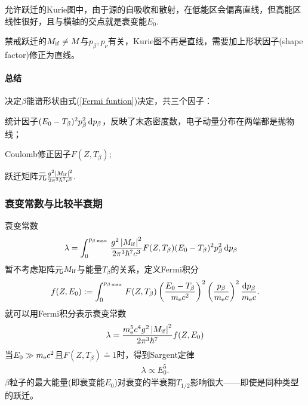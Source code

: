 允许跃迁的Kurie图中，由于源的自吸收和散射，在低能区会偏离直线，但高能区线性很好，且与横轴的交点就是衰变能$E_0.$

禁戒跃迁的$M_{\mathrm{i}\mathrm{f}}\neq M$与$p_\beta,p_\nu$有关，Kurie图不再是直线，需要加上形状因子(shape factor)修正为直线。
\paragraph{总结}决定$\beta$能谱形状由式(\ref{Fermi funtion})决定，共三个因子：
\begin{compactenum}
	\item 统计因子$(E_0-T_\beta)^2p_\beta^2\mathop{}\!\mathrm{d} p_\beta$，反映了末态密度数，电子动量分布在两端都是抛物线；
	\item Coulomb修正因子$F(Z,T_\beta)$;
	\item 跃迁矩阵元$\frac{g^2\left\lvert M_{\mathrm{i}\mathrm{f}}\right\rvert^2}{2\pi^3\hbar^7c^3}.$
\end{compactenum}
\subsubsection{衰变常数与比较半衰期}
衰变常数
\begin{align*}
	\lambda&=\int_0^{p_{\beta\max{}}}\frac{g^2\left\lvert M_{\mathrm{i}\mathrm{f}}\right\rvert^2}{2\pi^3\hbar^7c^3}F(Z,T_\beta)(E_0-T_\beta)^2p_\beta^2\mathop{}\!\mathrm{d} p_\beta
\end{align*}
暂不考虑矩阵元$M_{\mathrm{i}\mathrm{f}}$与能量$T_\beta$的关系，定义Fermi积分
\begin{align}
	f(Z,E_0):=\int_0^{p_{\beta\max{}}}F(Z,T_\beta)\left(\frac{E_0-T_\beta}{m_\mathrm e c^2}\right)^2\left(\frac{p_\beta}{m_\mathrm e c}\right)^2\frac{\mathop{}\!\mathrm{d} p_\beta}{m_\mathrm e c}.
\end{align}
就可以用Fermi积分表示衰变常数
\[
	\lambda=\frac{m_\mathrm e^5c^4g^2\left\lvert M_{\mathrm{i}\mathrm{f}}\right\rvert^2}{2\pi^3\hbar^7}f(Z,E_0)
\]
当$E_0\gg m_\mathrm e c^2$且$F(Z,T_\beta)\doteq 1$时，得到Sargent定律
\begin{align}
	\lambda\propto E_0^5.
\end{align}
$\beta$粒子的最大能量(即衰变能$E_0$)对衰变的半衰期$T_{1/2}$影响很大——即使是同种类型的跃迁。
